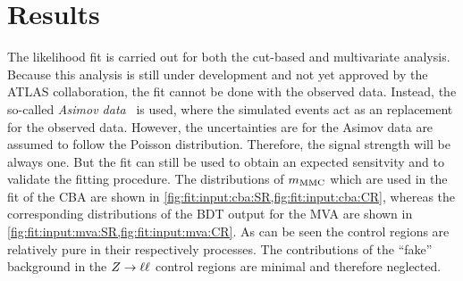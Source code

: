\section{Results}\label{sec:fit:results}

The likelihood fit is carried out for both the cut-based and multivariate analysis.
Because this analysis is still under development and not yet approved by the ATLAS collaboration, the fit cannot be done
with the observed data.
Instead, the so-called \emph{Asimov data}~\cite{FitATLAS} is used, where the simulated events act as an replacement for the observed data.
However, the uncertainties are for the Asimov data are assumed to follow the Poisson distribution.
Therefore, the signal strength will be always one.
But the fit can still be used to obtain an expected sensitvity and to validate the fitting procedure.
The distributions of $m_\text{MMC}$ which are used in the fit of the CBA are shown in \cref{fig:fit:input:cba:SR,fig:fit:input:cba:CR}, whereas the
corresponding distributions of the BDT output for the MVA are shown in \cref{fig:fit:input:mva:SR,fig:fit:input:mva:CR}.
As can be seen the control regions are relatively pure in their respectively processes.
The contributions of the ``fake'' background in the $Z \to \ell \ell$ control regions are minimal and therefore neglected.

